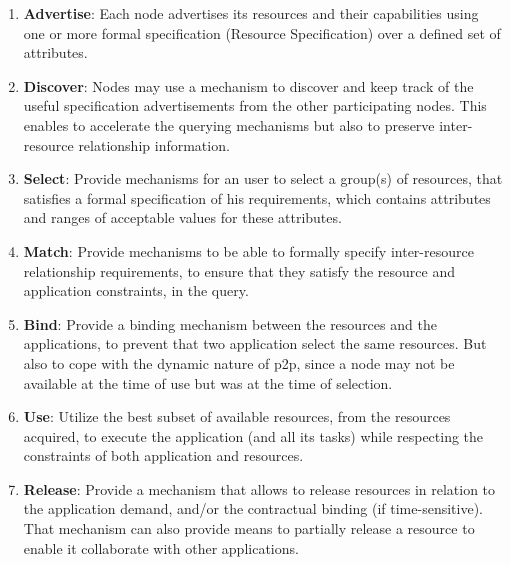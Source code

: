 \documentclass[11pt]{amsart}
\begin{document}
        \begin{enumerate}
          \item \textbf{Advertise}: Each node advertises its resources and their
            capabilities using one or more formal specification (Resource
            Specification) over a defined set of attributes.
          \item \textbf{Discover}: Nodes may use a mechanism to discover and
            keep track of the useful specification advertisements from the
            other participating nodes. This enables to accelerate the querying
            mechanisms but also to preserve inter-resource relationship
            information.
          \item \textbf{Select}: Provide mechanisms for an user to select a group(s)
            of resources, that satisfies a formal specification of his
            requirements, which contains attributes and ranges of acceptable
            values for these attributes.
          \item \textbf{Match}: Provide mechanisms to be able to formally
            specify inter-resource relationship requirements, to ensure that
            they satisfy the resource and application constraints, in the query.
          \item \textbf{Bind}: Provide a binding mechanism between the resources
            and the applications, to prevent that two application select the
            same resources. But also to cope with the dynamic nature of p2p,
            since a node may not be available at the time of use but was at the
            time of selection.
          \item \textbf{Use}: Utilize the best subset of available resources,
            from the resources acquired, to execute the application (and all its
            tasks) while respecting the constraints of both application and
            resources.
          \item \textbf{Release}: Provide a mechanism that allows to release
            resources in relation to the application demand, and/or the
            contractual binding (if time-sensitive). That mechanism can also
            provide means to partially release a resource to enable it
            collaborate with other applications.
        \end{enumerate}
        
\end{document}
